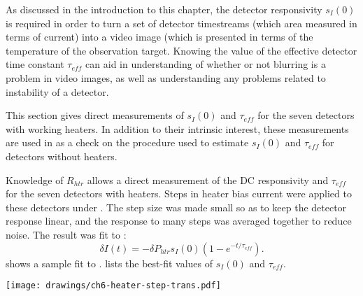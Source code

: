 %
%

As discussed in the introduction to this chapter, the detector responsivity $s_I(0)$ is required in order to turn a set of detector timestreams (which area measured in terms of current) into a video image (which is presented in terms of the temperature of the observation target.
Knowing the value of the effective detector time constant $\tau_{eff}$ can aid in understanding of whether or not blurring is a problem in video images, as well as understanding any problems related to instability of a detector.

This section gives direct measurements of $s_I(0)$ and $\tau_{eff}$ for the seven detectors with working heaters.
In addition to their intrinsic interest, these measurements are used in  as a check on the procedure used to estimate $s_I(0)$ and $\tau_{eff}$ for detectors without heaters.

Knowledge of $R_{htr}$ allows a direct measurement of the DC responsivity and $\tau_{eff}$ for the seven detectors with heaters.
Steps in heater bias current were applied to these detectors under \SOC.
The step size was made small so as to keep the detector response linear, and the response to many steps was averaged together to reduce noise.
The result was fit to :
\begin{equation} \label{eqn:ch6-heater-step-trans}
  \delta I(t) = - \delta P_{htr} s_I(0) (1 - e^{-t/\tau_{eff}}).
\end{equation}
 shows a sample fit to .
 lists the best-fit values of $s_I(0)$ and $\tau_{eff}$.

\begin{figure*}
\centering
\texttt{[image: drawings/ch6-heater-step-trans.pdf]}
\caption[Detector response to heater steps]{
Plot showing response of detector  to step in applied heater power of \SI{1.41}{\pico\watt}.
Plots are for  biased into \SOC.
The data averaged over 32 steps (16 up and 16 down), along with best fit to , are plotted.
The step in applied power begins at $t \approx \SI{0.6}{\ms}$, not $t = \SI{0}{\ms}$.
} 
\label{fig:ch6-heater-step-trans}
\end{figure*}


